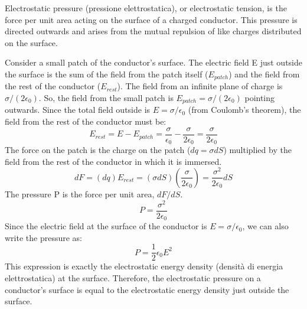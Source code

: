 Electrostatic pressure (pressione elettrostatica), or electrostatic tension, is the force per unit area acting on the surface of a charged conductor. This pressure is directed outwards and arises from the mutual repulsion of like charges distributed on the surface.

Consider a small patch of the conductor's surface. The electric field E just outside the surface is the sum of the field from the patch itself ($E_{patch}$) and the field from the rest of the conductor ($E_{rest}$). The field from an infinite plane of charge is $\sigma / (2\epsilon_0)$. So, the field from the small patch is $E_{patch} = \sigma / (2\epsilon_0)$ pointing outwards.
Since the total field outside is $E = \sigma / \epsilon_0$ (from Coulomb's theorem), the field from the rest of the conductor must be:
\begin{equation*}
E_{rest} = E - E_{patch} = \frac{\sigma}{\epsilon_0} - \frac{\sigma}{2\epsilon_0} = \frac{\sigma}{2\epsilon_0}
\end{equation*}
The force on the patch is the charge on the patch ($dq = \sigma dS$) multiplied by the field from the rest of the conductor in which it is immersed.
\begin{equation*}
dF = (dq) E_{rest} = (\sigma dS) \left( \frac{\sigma}{2\epsilon_0} \right) = \frac{\sigma^2}{2\epsilon_0} dS
\end{equation*}
The pressure P is the force per unit area, $dF/dS$.
\begin{equation*}
P = \frac{\sigma^2}{2\epsilon_0}
\end{equation*}
Since the electric field at the surface of the conductor is $E = \sigma / \epsilon_0$, we can also write the pressure as:
\begin{equation*}
P = \frac{1}{2}\epsilon_0 E^2
\end{equation*}
This expression is exactly the electrostatic energy density (densità di energia elettrostatica) at the surface. Therefore, the electrostatic pressure on a conductor's surface is equal to the electrostatic energy density just outside the surface.
